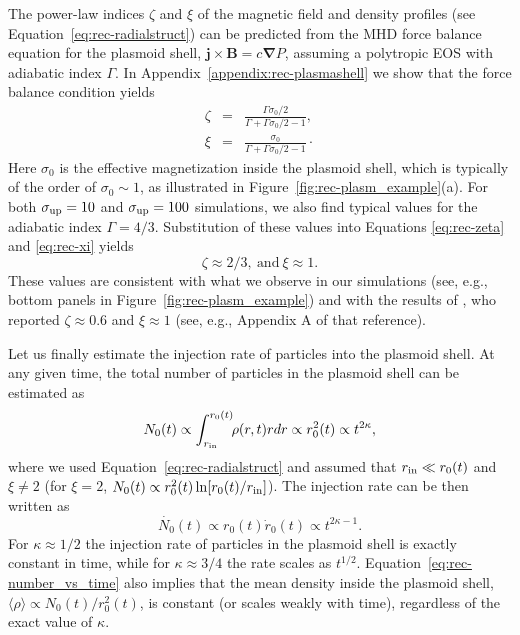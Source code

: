 The power-law indices $\zeta$ and $\xi$ of the magnetic field and density profiles (see Equation~\eqref{eq:rec-radialstruct}) can be predicted from the MHD force balance equation for the plasmoid shell, $\bm{j}\times\bm{B}=c{\bm \nabla} P$, assuming a polytropic EOS with adiabatic index $\Gamma$. In Appendix~\ref{appendix:rec-plasmashell} we show that the force balance condition yields 
\begin{eqnarray}
    \label{eq:rec-zeta}
    \zeta & = & \frac{\Gamma\sigma_0/2}{\Gamma + \Gamma\sigma_0/2 - 1}, \\
    \xi & = &  \frac{\sigma_0}{\Gamma + \Gamma\sigma_0/2 - 1} \cdot
    \label{eq:rec-xi}
\end{eqnarray}
Here $\sigma_0$ is the effective magnetization inside the plasmoid shell, which is typically of the order of $\sigma_0\sim 1$, as illustrated in Figure~\ref{fig:rec-plasm_example}(a). For both $\sigma_{\rm up} = 10$ and $\sigma_{\rm up} = 100$ simulations, we also find typical values for the adiabatic index $\Gamma=4/3$. Substitution of these values into Equations \eqref{eq:rec-zeta} and \eqref{eq:rec-xi} yields
\begin{equation}
    \zeta \approx 2/3,~\text{and}~\xi \approx 1.
\end{equation}
These values are consistent with what we observe in our simulations (see, e.g., bottom panels in Figure~\ref{fig:rec-plasm_example}) and with the results of \cite{2016MNRAS.462...48S}, who reported $\zeta\approx 0.6$ and $\xi \approx 1$ (see, e.g., Appendix A of that reference).


Let us finally estimate the injection rate of particles into the plasmoid shell. At any given time, the total number of particles in the plasmoid shell can be estimated as 
\begin{equation}
    \label{eq:rec-number_vs_time}
    N_0(t)\propto \int_{r_{\rm in}}^{r_0(t)} \! \! \rho(r, t) rdr \propto r^2_0(t) \propto t^{2\kappa},
\end{equation}
where we used Equation~\eqref{eq:rec-radialstruct} and assumed that $r_{\rm in} \ll r_0(t)$ and $\xi \ne 2$ (for $\xi=2$, $N_0(t) \propto r^2_0(t) \ln [r_0(t)/r_{\rm in}]$). The injection rate can be then written as
\begin{equation}
    \label{eq:rec-injrate}
    \dot{N_0}(t)\propto r_0(t)\dot{r}_0(t)\propto t^{2\kappa-1}.
\end{equation}
For $\kappa\approx 1/2$ the injection rate of particles in the plasmoid shell is exactly constant in time, while for $\kappa\approx 3/4$ the rate scales as $t^{1/2}$. Equation~\eqref{eq:rec-number_vs_time} also implies that the mean density inside the plasmoid shell, $\langle\rho\rangle \propto N_0(t)/r^2_0(t)$, is constant (or scales weakly with time), regardless of the exact value of $\kappa$.  

